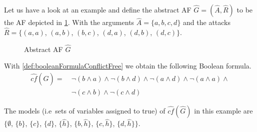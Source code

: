 \begin{example}
    Let us have a look at an example and define the abstract AF $\hat{G} = (\hat{A}, \hat{R})$ to be the AF depicted in \cref{af:algorithmEncodingsConflictFree}. With the arguments $\hat{A}=\{a, b, c, d\}$ and the attacks $\hat{R}=\big\{ (a,a)$, $(a,b)$, $(b,c)$, $(d,a)$, $(d,b)$, $(d,c)\big\}$.

    \begin{figure}[H]
        \centering
        \caption{Abstract AF $\hat{G}$}
        \label{af:algorithmEncodingsConflictFree}
    \end{figure}

With \cref{def:booleanFormulaConflictFree} we obtain the following Boolean formula.
\begin{align*}
    \hat{cf}(\hat{G}) =\ &
    \lnot(b \land a)  \land
    \lnot(b \land d)  \land
    \lnot(a \land d)  \land
    \lnot(a \land a)  \land
    \\
    & \lnot(c \land b)  \land
    \lnot(c \land d)
\end{align*}

The models (i.e\ sets of variables assigned to true) of $\hat{cf}(\hat{G})$ in this example are $\bigl\{\emptyset$, $\{b\}$, $\{c\}$, $\{d\}$, $\{\hat{h}\}$, $\{b, \hat{h}\}$, $\{c, \hat{h}\}$, $\{d, \hat{h}\}\bigl\}$.
\end{example}


